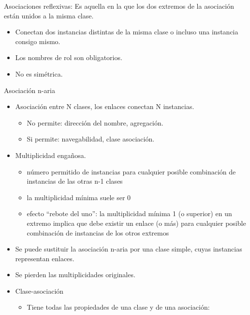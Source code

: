 \documentclass[12pt, twoside, openright]{report} %
\begin{document}
	Asociaciones reflexivas: Es aquella en la que los dos extremos de la
    asociación están unidos a la misma clase.

    \begin{itemize}
    
    \item
      Conectan dos instancias distintas de la misma clase o incluso una
      instancia consigo mismo.
    \item
      Los nombres de rol son obligatorios.
    \item
      No es simétrica.
    \end{itemize}
	
	Asociación n-aria

    \begin{itemize}
    \item
      Asociación entre N clases, los enlaces conectan N instancias.

      \begin{itemize}
      
      \item
        No permite: dirección del nombre, agregación.
      \item
        Si permite: navegabilidad, clase asociación.
      \end{itemize}
    \item
      Multiplicidad engañosa.
	  \begin{itemize}
		  \item número permitido de instancias para cualquier posible combinación de
instancias de las otras n-1 clases
		  \item la multiplicidad mínima suele ser 0
		  \item efecto “rebote del uno”: la multiplicidad mínima 1 (o superior) en un extremo
implica que debe existir un enlace (o más) para cualquier posible combinación de
instancias de los otros extremos
	  \end{itemize}

    \item
      Se puede sustituir la asociación n-aria por una clase simple,
      cuyas instancias representan enlaces.
    \item
      Se pierden las multiplicidades originales.
    \item
      Clase-asociación

      \begin{itemize}
      \item
        Tiene todas las propiedades de una clase y de una asociación:


\end{itemize}
\end{itemize}
\end{document}
